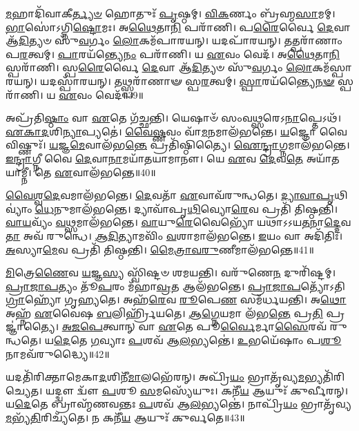 \-\ul{𑌮}\-𑌹𑌾𑌦𑌿᳴𑌵𑌾𑌕𑍀\-\ul{𑌰𑍍𑌤𑍍𑌯}\-\-\ul{𑍞} 𑌹𑍋𑌤𑍁𑌃᳴ \ul{𑌪𑍃}\-𑌷𑍍𑌠𑌮𑍍।
\-\ul{𑌵𑌿}\-\-\ul{𑌕}\-𑌰𑍍𑌣𑌂 𑌬𑍍𑌰᳴𑌹𑍍𑌮\-\ul{𑌸𑌾}\-𑌮𑌮𑍍।
\-\ul{𑌭𑌾}\-𑌸𑍋॑\-𑌽𑌗𑍍𑌨𑌿\-\ul{𑌷𑍍𑌟𑍋}\-𑌮𑌃।
𑌅\-\ul{𑌥𑍈}\-𑌤𑌾\-\ul{𑌨𑌿} 𑌪𑌰𑌾᳴𑌣𑌿।
𑌪\-\ul{𑌰𑍈}\-𑌰𑍍𑌵𑍈 \ul{𑌦𑍇}\-𑌵𑌾 𑌆᳴\-\ul{𑌦𑌿}\-𑌤𑍍𑌯𑍞 𑌸𑍁᳴\-\ul{𑌵}\-𑌰𑍍𑌗𑌂 \ul{𑌲𑍋}\-𑌕𑌮᳴𑌪𑌾𑌰𑌯𑌨𑍍।
𑌯𑌦𑌪𑌾᳴𑌰𑌯𑌨𑍍।
𑌤𑌤𑍍𑌪𑌰𑌾᳴𑌣𑌾𑌂 𑌪\-\ul{𑌰}\-𑌤𑍍𑌵𑌮𑍍।
\-\ul{𑌪𑌾}\-𑌰𑌯᳴𑌨𑍍𑌤𑍍𑌯𑍇\-\ul{𑌨𑌂} 𑌪𑌰𑌾᳴𑌣𑌿।
𑌯 \ul{𑌏}\-𑌵𑌂 𑌵𑍇𑌦᳴।
𑌅\-\ul{𑌥𑍈}\-𑌤𑌾\-\ul{𑌨𑌿} 𑌸𑍍𑌪𑌰𑌾᳴𑌣𑌿।
𑌸𑍍𑌪\-\ul{𑌰𑍈}\-𑌰𑍍𑌵𑍈 \ul{𑌦𑍇}\-𑌵𑌾 𑌆᳴\-\ul{𑌦𑌿}\-𑌤𑍍𑌯𑍞 𑌸𑍁᳴\-\ul{𑌵}\-𑌰𑍍𑌗𑌂 \ul{𑌲𑍋}\-𑌕𑌮᳴𑌸𑍍𑌪𑌾𑌰𑌯𑌨𑍍।
𑌯𑌦𑌸𑍍𑌪𑌾᳴𑌰𑌯𑌨𑍍।
𑌤𑌥𑍍𑌸𑍍𑌪𑌰𑌾᳴𑌣𑌾𑍟 𑌸𑍍𑌪\-\ul{𑌰}\-𑌤𑍍𑌵𑌮𑍍।
\-\ul{𑌸𑍍𑌪𑌾}\-𑌰𑌯᳴𑌨𑍍𑌤𑍍𑌯𑍈\-\ul{𑌨}\-\-\ul{𑍟} 𑌸𑍍𑌪𑌰𑌾᳴𑌣𑌿।
𑌯 \ul{𑌏}\-𑌵𑌂 𑌵𑍇𑌦᳴॥39॥\anuvakamend[\-\ul{𑌏}\-\-\ul{𑌤𑌿} 𑌪𑌵᳴𑌮𑌾𑌨\-\ul{𑌯𑍋𑌃} 𑌸𑍍𑌪𑌰𑌾᳴\-\ul{𑌣𑌿} 𑌪𑌞𑍍𑌚᳴ 𑌚]

𑌅𑌪𑍍𑌰᳴𑌤𑌿\-\ul{𑌷𑍍𑌠𑌾𑌂} 𑌵𑌾 \ul{𑌏}\-𑌤𑍇 𑌗᳴𑌚𑍍𑌛𑌨𑍍𑌤𑌿।
𑌯𑍇𑌷𑌾𑍞᳴ 𑌸𑌂𑌵\-\ul{𑌥𑍍𑌸}\-𑌰𑍇\-𑌽\-\ul{𑌨𑌾}\-𑌪𑍍𑌤𑍇𑌽𑌥᳴।
\-\ul{𑌏}\-\-\ul{𑌕𑌾}\-\-\ul{𑌦}\-𑌶𑌿\-\ul{𑌨𑍍𑌯𑌾}\-𑌪𑍍𑌯𑌤𑍇॑।
\-\ul{𑌵𑍈}\-\-\ul{𑌷𑍍𑌣}\-𑌵𑌂 𑌵𑌾᳴\-\ul{𑌮}\-𑌨𑌮𑌾𑌲᳴𑌭𑌨𑍍𑌤𑍇।
\-\ul{𑌯}\-𑌜𑍍𑌞𑍋 𑌵𑍈 𑌵𑌿𑌷𑍍𑌣𑍁𑌃᳴।
\-\ul{𑌯}\-𑌜𑍍𑌞\-\ul{𑌮𑍇}\-𑌵𑌾𑌲᳴𑌭\-\ul{𑌨𑍍𑌤𑍇} 𑌪𑍍𑌰𑌤𑌿᳴\-𑌷𑍍𑌠𑌿𑌤𑍍𑌯𑍈।
\-\ul{𑌐}\-\-\ul{𑌨𑍍𑌦𑍍𑌰𑌾}\-𑌗𑍍𑌨𑌮𑌾𑌲᳴𑌭𑌨𑍍𑌤𑍇।
\-\ul{𑌇}\-\-\ul{𑌨𑍍𑌦𑍍𑌰𑌾}\-𑌗𑍍𑌨𑍀 𑌵𑍈 \ul{𑌦𑍇}\-𑌵𑌾\-\ul{𑌨𑌾}\-𑌮𑌯𑌾᳴𑌤𑌯𑌾𑌮𑌾𑌨𑍗।
𑌯𑍇 \ul{𑌏}\-𑌵 \ul{𑌦𑍇}\-𑌵\-\ul{𑌤𑍇} 𑌅𑌯𑌾᳴𑌤𑌯𑌾𑌮𑍍𑌨𑍀।
𑌤𑍇 \ul{𑌏}\-𑌵𑌾𑌲᳴𑌭𑌨𑍍𑌤𑍇॥40॥

\-\ul{𑌵𑍈}\-\-\ul{𑌶𑍍𑌵}\-\-\ul{𑌦𑍇}\-𑌵𑌮𑌾𑌲᳴𑌭𑌨𑍍𑌤𑍇।
\-\ul{𑌦𑍇}\-𑌵𑌤𑌾᳴ \ul{𑌏}\-𑌵𑌾𑌵᳴𑌰𑍁𑌨𑍍𑌧𑌤𑍇।
\-\ul{𑌦𑍍𑌯𑌾}\-\-\ul{𑌵𑌾}\-\-\ul{𑌪𑍃}\-𑌥𑌿𑌵𑍍𑌯𑌾𑌂॑ \ul{𑌧𑍇}\-𑌨𑍁𑌮𑌾𑌲᳴𑌭𑌨𑍍𑌤𑍇।
𑌦𑍍𑌯𑌾𑌵𑌾᳴𑌪𑍃\-\ul{𑌥𑌿}\-𑌵𑍍𑌯𑍋\-\ul{𑌰𑍇}\-𑌵 𑌪𑍍𑌰𑌤𑌿᳴ 𑌤𑌿𑌷𑍍𑌠𑌨𑍍𑌤𑌿।
\-\ul{𑌵𑌾}\-\-\ul{𑌯}\-𑌵𑍍𑌯𑌂᳴ \ul{𑌵}\-𑌥𑍍𑌸𑌮𑌾𑌲᳴𑌭𑌨𑍍𑌤𑍇।
\-\ul{𑌵𑌾}\-𑌯𑍁\-\ul{𑌰𑍇}\-𑌵𑍈𑌭𑍍𑌯𑍋᳴ 𑌯𑌥𑌾\-𑌽𑌽𑌯\-\ul{𑌤}\-𑌨𑌾\-\ul{𑌦𑍍𑌦𑍇}\-𑌵\-\ul{𑌤𑌾} 𑌅𑌵᳴ 𑌰𑍁𑌨𑍍𑌧𑍇।
\-\ul{𑌆}\-\-\ul{𑌦𑌿}\-𑌤𑍍𑌯𑌾𑌮𑌵𑌿𑌂᳴ \ul{𑌵}\-𑌶𑌾𑌮𑌾𑌲᳴𑌭𑌨𑍍𑌤𑍇।
\-\ul{𑌇}\-𑌯𑌂 𑌵𑌾 𑌅𑌦𑌿᳴𑌤𑌿𑌃।
\-\ul{𑌅}\-𑌸𑍍𑌯𑌾\-\ul{𑌮𑍇}\-𑌵 𑌪𑍍𑌰𑌤𑌿᳴ 𑌤𑌿𑌷𑍍𑌠𑌨𑍍𑌤𑌿।
\-\ul{𑌮𑍈}\-\-\ul{𑌤𑍍𑌰𑌾}\-\-\ul{𑌵}\-\-\ul{𑌰𑍁}\-𑌣𑍀𑌮𑌾𑌲᳴𑌭𑌨𑍍𑌤𑍇॥41॥

\-\ul{𑌮𑌿}\-𑌤𑍍𑌰𑍇\-\ul{𑌣𑍈}\-𑌵 \ul{𑌯}\-𑌜𑍍𑌞\-\ul{𑌸𑍍𑌯} 𑌸𑍍𑌵𑌿᳴𑌷𑍍𑌟𑍞 𑌶𑌮𑌯𑌨𑍍𑌤𑌿।
𑌵𑌰𑍁᳴𑌣𑍇\-\ul{𑌨} 𑌦𑍁𑌰𑌿᳴𑌷𑍍𑌟𑌮𑍍।
\-\ul{𑌪𑍍𑌰𑌾}\-\-\ul{𑌜𑌾}\-\-\ul{𑌪}\-𑌤𑍍𑌯𑌂 𑌤𑍂᳴\-\ul{𑌪}\-𑌰𑌂 𑌮᳴𑌹𑌾\-\ul{𑌵𑍍𑌰}\-𑌤 𑌆𑌲᳴𑌭𑌨𑍍𑌤𑍇।
\-\ul{𑌪𑍍𑌰𑌾}\-\-\ul{𑌜𑌾}\-\-\ul{𑌪}\-𑌤𑍍𑌯𑍋᳴\-𑌽𑌤𑌿\-\ul{𑌗𑍍𑌰𑌾}\-𑌹𑍍𑌯𑍋᳴ 𑌗𑍃𑌹𑍍𑌯𑌤𑍇।
𑌅𑌹᳴\-\ul{𑌰𑍇}\-𑌵 \ul{𑌰𑍂}\-𑌪𑍇\-\ul{𑌣} 𑌸𑌮᳴𑌰𑍍𑌧𑌯𑌨𑍍𑌤𑌿।
𑌅\-\ul{𑌥𑍋} 𑌅𑌹𑍍𑌨᳴ \ul{𑌏}\-𑌵𑍈𑌷 \ul{𑌬}\-𑌲𑌿𑌰𑍍\mbox{}𑌹𑍍𑌰𑌿᳴𑌯𑌤𑍇।
\-\ul{𑌆}\-\-\ul{𑌗𑍍𑌨𑍇}\-𑌯𑌮𑌾 𑌲᳴𑌭\-\ul{𑌨𑍍𑌤𑍇} 𑌪𑍍𑌰\-\ul{𑌤𑌿} 𑌪𑍍𑌰𑌜𑍍𑌞𑌾॑𑌤𑍍𑌯𑍈।
\-\ul{𑌅}\-\-\ul{𑌜}\-\-\ul{𑌪𑍇}\-𑌤𑍍𑌵𑌾𑌨𑍍 𑌵𑌾 \ul{𑌏}\-𑌤𑍇 𑌪𑍂\-\ul{𑌰𑍍𑌵𑍈}\-𑌰𑍍𑌮𑌾\-\ul{𑌸𑍈}\-𑌰𑌵᳴ 𑌰𑍁𑌨𑍍𑌧𑌤𑍇।
𑌯\-\ul{𑌦𑍇}\-𑌤𑍇 \ul{𑌗}\-𑌵𑍍𑌯𑌾𑌃 \ul{𑌪}\-𑌶𑌵᳴ 𑌆\-\ul{𑌲}\-𑌭𑍍𑌯𑌨𑍍𑌤𑍇॑।
\-\ul{𑌉}\-𑌭𑌯𑍇᳴𑌷𑌾𑌂 𑌪\-\ul{𑌶𑍂}\-𑌨𑌾𑌮𑌵᳴𑌰𑍁𑌦𑍍𑌧𑍍𑌯𑍈॥42॥

𑌯𑌦𑌤𑌿᳴𑌰𑌿𑌕𑍍𑌤𑌾𑌮𑍇𑌕𑌾\-\ul{𑌦}\-𑌶𑌿𑌨𑍀᳴\-\ul{𑌮𑌾}\-𑌲𑌭𑍇᳴𑌰𑌨𑍍।
𑌅𑌪𑍍𑌰𑌿᳴\-\ul{𑌯𑌂} 𑌭𑍍𑌰𑌾𑌤𑍃᳴𑌵𑍍𑌯\-\ul{𑌮}\-𑌭𑍍𑌯𑌤𑌿᳴\-𑌰𑌿𑌚𑍍𑌯𑍇𑌤।
𑌯𑌦𑍍𑌦𑍍𑌵𑍗 𑌦𑍍𑌵𑍗᳴ \ul{𑌪}\-𑌶𑍂 \ul{𑌸}\-𑌮𑌸𑍍𑌯𑍇᳴𑌯𑍁𑌃।
𑌕𑌨𑍀᳴\-\ul{𑌯} 𑌆𑌯𑍁𑌃᳴ 𑌕𑍁𑌰𑍍𑌵𑍀𑌰𑌨𑍍।
𑌯\-\ul{𑌦𑍇}\-𑌤𑍇 𑌬𑍍𑌰𑌾𑌹𑍍𑌮᳴𑌣𑌵𑌨𑍍𑌤𑌃 \ul{𑌪}\-𑌶𑌵᳴ 𑌆\-\ul{𑌲}\-𑌭𑍍𑌯𑌨𑍍𑌤𑍇॑।
𑌨𑌾𑌪𑍍𑌰𑌿᳴\-\ul{𑌯𑌂} 𑌭𑍍𑌰𑌾𑌤𑍃᳴𑌵𑍍𑌯\-\ul{𑌮}\-𑌭𑍍𑌯᳴\-\ul{𑌤𑌿}\-𑌰𑌿𑌚𑍍𑌯᳴𑌤𑍇।
𑌨 𑌕𑌨𑍀᳴\-\ul{𑌯} 𑌆𑌯𑍁𑌃᳴ 𑌕𑍁𑌰𑍍𑌵𑌤𑍇॥43॥\anuvakamend[𑌤𑍇 \ul{𑌏}\-𑌵𑌾𑌲᳴𑌭𑌨𑍍𑌤𑍇 𑌮𑍈𑌤𑍍𑌰𑌾𑌵\-\ul{𑌰𑍁}\-𑌣𑍀𑌮𑌾𑌲᳴\-\ul{𑌭}\-𑌨𑍍𑌤𑍇\-𑌽𑌵᳴𑌰𑍁𑌦𑍍𑌧𑍍𑌯𑍈 \ul{𑌸}\-𑌪𑍍𑌤 𑌚᳴]


